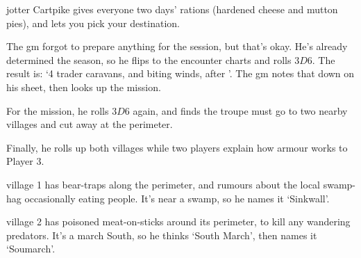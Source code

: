 \begin{multicols}{2}
{\begin{description}
    \Gls{jotter} Cartpike gives everyone two days' rations (hardened cheese and mutton pies), and lets you pick your destination.
  \end{description}

}{
  The \gls{gm} forgot to prepare anything for the session, but that's okay.
  He's already determined the season, so he flips to the encounter charts and rolls $3D6$.
  The result is: `4 trader caravans, and biting winds, after '.
  The \gls{gm} notes that down on his sheet, then looks up the mission.

  For the mission, he rolls $3D6$ again, and finds the troupe must go to two nearby \glspl{village} and cut away at the perimeter.

  Finally, he rolls up both \glspl{village} while two players explain how armour works to Player 3.

  \Gls{village} 1 has bear-traps along the perimeter, and rumours about the local swamp-hag occasionally eating people.
  It's near a swamp, so he names it `Sinkwall'.

  \Gls{village} 2 has poisoned meat-on-sticks around its perimeter, to kill any wandering predators.
  It's a march South, so he thinks `South March', then names it `Soumarch'.

}

\end{multicols}
